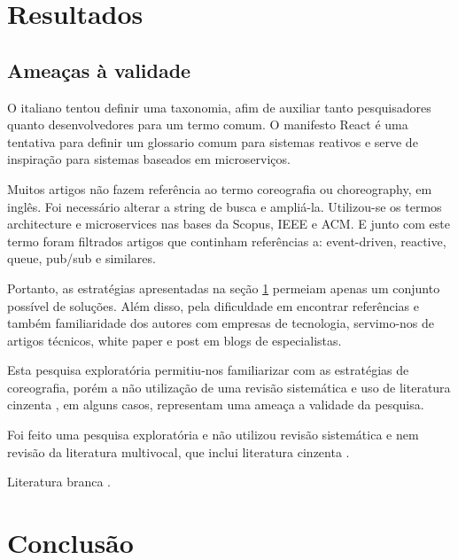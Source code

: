\documentclass[12pt]{article}
\theoremstyle{plain}
\begin{document}
\section{Resultados}
\label{sec:resultados}

\subsection{Ameaças à validade}

O italiano tentou definir uma taxonomia, afim de auxiliar tanto pesquisadores quanto desenvolvedores para um termo comum. O manifesto React é uma tentativa para definir um glossario comum para sistemas reativos e serve de inspiração para sistemas baseados em microserviços.

Muitos artigos não fazem referência ao termo coreografia ou choreography, em inglês. Foi necessário alterar a string de busca e ampliá-la. Utilizou-se os termos architecture e microservices nas bases da Scopus, IEEE e ACM. E junto com este termo foram filtrados artigos que continham referências a: event-driven, reactive, queue, pub/sub e similares.

Portanto, as estratégias apresentadas na seção  \ref{sec:resultados} permeiam apenas um conjunto possível de soluções. Além disso, pela dificuldade em encontrar referências e também familiaridade dos autores com empresas de tecnologia, servimo-nos de artigos técnicos, white paper e post em blogs de especialistas. 

Esta pesquisa exploratória permitiu-nos familiarizar com as estratégias de coreografia, porém a não utilização de uma revisão sistemática e uso de literatura cinzenta \cite{GAROUSI2018}, em alguns casos, representam uma ameaça a validade da pesquisa.

Foi feito uma pesquisa exploratória e não utilizou revisão sistemática e nem revisão da literatura multivocal, que inclui literatura cinzenta \cite{GAROUSI2018}.

Literatura branca \cite{botelho:2017}.

\section{Conclusão}
\label{sec:conclusao}
\end{document}
